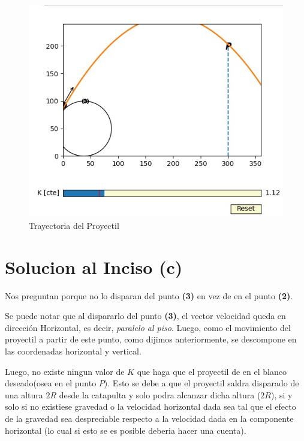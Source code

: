 \documentclass[fleqn,10pt]{SelfArx} %
\begin{document}
\begin{figure}[ht] %
\centering
\includegraphics[scale=0.5]{figuras/fig4.jpg}
\caption{Trayectoria del Proyectil}
\end{figure}

\section{Solucion al Inciso (c)}
Nos preguntan porque no lo disparan del punto \textbf{(3)} en vez de en el punto \textbf{(2)}.

Se puede notar que al dispararlo del punto \textbf{(3)}, el vector velocidad queda en dirección Horizontal, es decir, \textit{paralelo al piso}. Luego, como el movimiento del proyectil a partir de este punto, como dijimos anteriormente, se descompone en las coordenadas horizontal y vertical. 

Luego, no existe ningun valor de $K$ que haga que el proyectil de en el blanco deseado(osea en el punto $P$). Esto se debe a que el proyectil saldra disparado de una altura $2R$ desde la catapulta y solo podra alcanzar dicha altura ($2R$), si y solo si no existiese gravedad o la velocidad horizontal dada sea tal que el efecto de la gravedad sea despreciable respecto a la velocidad dada en la componente horizontal (lo cual si esto se es posible deberia hacer una cuenta).   
\end{document}
